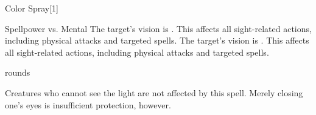 \begin{spellsection}{Color Spray}[1]
    \begin{spellheader}
    \end{spellheader}
    \begin{spellcontent}
        \begin{spelltargetinginfo}
        \end{spelltargetinginfo}
        \begin{spelleffects}
            \begin{spellattack}{Spellpower vs. Mental}
                \spellsuccess The target's vision is \impaired. This affects all sight-related actions, including physical attacks and targeted spells.
                \spellcritical The target's vision is \severelyimpaired. This affects all sight-related actions, including physical attacks and targeted spells.
            \end{spellattack}
             rounds
        \end{spelleffects}
    \end{spellcontent}
    \begin{spellfooter}
        \spellnotes Creatures who cannot see the light are not affected by this spell. Merely closing one's eyes is insufficient protection, however.
        \miscastexplode
    \end{spellfooter}
\end{spellsection}

